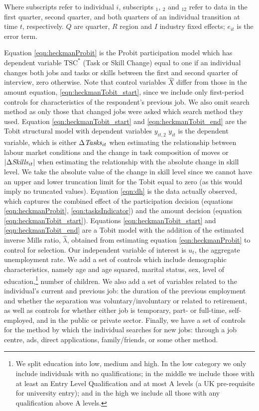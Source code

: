 \documentclass[12pt,authoryear]{elsarticle}
\begin{document}
	Where subscripts refer to individual $i$, subscripts $_1$, $_2$ and $_{12}$ refer to data in the first quarter, second quarter, and both quarters of an individual transition at time $t$, respectively. $Q$ are quarter, $R$ region and $I$ industry fixed effects; $e_{it}$ is the error term. 
	
	
	\vspace{2mm}
	
	
	Equation \ref{eqn:heckmanProbit} is the Probit participation model which has dependent variable $\text{TSC}^{*}$ (Task or Skill Change) equal to one if an individual changes both jobs and tasks or skills between the first and second quarter of interview, zero otherwise. Note that control variables $\hat{X}$ differ from those in the amount equation, \ref{eqn:heckmanTobit_start}, since we include only first-period controls for characteristics of the respondent's previous job. We also omit search method as only those that changed jobs were asked which search method they used.  Equation \ref{eqn:heckmanTobit_start} and  \ref{eqn:heckmanTobit_end} are the Tobit structural model with dependent variables $y_{it,2}$ $y_{it}$ is the dependent variable, which is either $\Delta\text{\textit{Tasks}}_{it}$ when estimating the relationship between labour market conditions and the change in task composition of moves or $|\Delta\text{\textit{Skills}}_{it}|$ when estimating the relationship with the absolute change in skill level. We take the absolute value of the change in skill level since we cannot have an upper and lower truncation limit for the Tobit equal to zero (as this would imply no truncated values). Equation \ref{eqn:dh} is the data actually observed, which captures the combined effect of the participation decision (equations \ref{eqn:heckmanProbit}, \ref{eqn:tasksIndicator}) and the amount decision (equation \ref{eqn:heckmanTobit_start}). Equations \ref{eqn:heckmanTobit_start} and \ref{eqn:heckmanTobit_end}  are a Tobit model with the addition of the estimated inverse Mills ratio, $\hat{\lambda}$, obtained from estimating equation \ref{eqn:heckmanProbit} to control for selection. Our independent variable of interest is $u_{t}$, the aggregate unemployment rate. We add a set of controls which include demographic characteristics, namely age and age squared, marital status, sex, level of education,\footnote{We split education into low, medium and high. In the low category we only include individuals with no qualifications; in the middle we include those with at least an Entry Level Qualification and at most A levels (a UK pre-requisite for university entry); and in the high we include all those with any qualification above A levels.} number of children. We also add a set of variables related to the individual's current and previous job: the duration of the previous employment and whether the separation was voluntary/involuntary or related to retirement, as well as controls for whether either job is temporary, part- or full-time, self-employed, and in the public or private sector. Finally, we have a set of controls for the method by which the individual searches for new jobs: through a job centre, ads, direct applications, family/friends, or some other method. 
	
\end{document}
